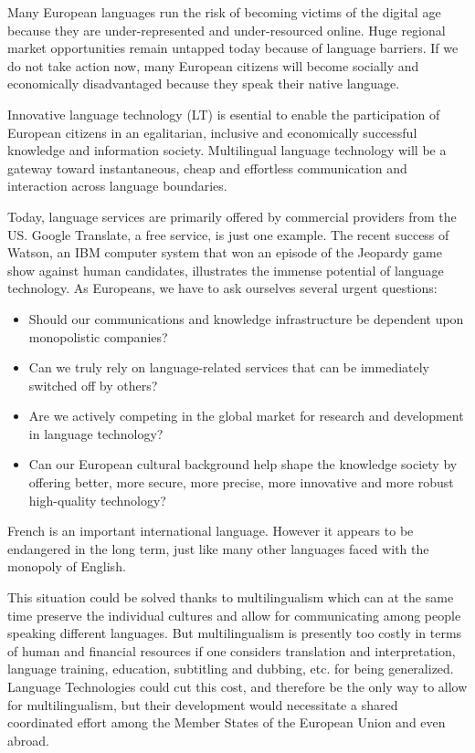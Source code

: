\setcounter{section}{0}
\setcounter{figure}{0}

\cleardoublepage



\begin{multicols}{2}
Many European languages run the risk of becoming victims of the
digital age because they are under-represented and under-resourced
online. Huge regional market opportunities remain untapped today
because of language barriers. If we do not take action now, many
European citizens will become socially and economically disadvantaged
because they speak their native language.

Innovative language technology (LT) is esential to enable the
participation of European citizens in an egalitarian, inclusive and
economically successful knowledge and information
society. Multilingual language technology will be a gateway toward
instantaneous, cheap and effortless communication and interaction
across language boundaries.

Today, language services are primarily offered by commercial providers
from the US. Google Translate, a free service, is just one
example. The recent success of Watson, an IBM computer system that won
an episode of the Jeopardy game show against human candidates,
illustrates the immense potential of language technology. As
Europeans, we have to ask ourselves several urgent questions:
\begin{itemize}
\item Should our communications and knowledge infrastructure be
  dependent upon monopolistic companies?
\item Can we truly rely on language-related services that can be
  immediately switched off by others?
\item Are we actively competing in the global market for research and
  development in language technology?
\item Can our European cultural background help shape the knowledge
  society by offering better, more secure, more precise, more
  innovative and more robust high-quality technology?
\end{itemize}

French is an important international language. However it appears to
be endangered in the long term, just like many other languages faced
with the monopoly of English.

This situation could be solved thanks to multilingualism which can at
the same time preserve the individual cultures and allow for
communicating among people speaking different languages. But
multilingualism is presently too costly in terms of human and
financial resources if one considers translation and interpretation,
language training, education, subtitling and dubbing, etc. for being
generalized. Language Technologies could cut this cost, and therefore
be the only way to allow for multilingualism, but their development
would necessitate a shared coordinated effort among the Member States
of the European Union and even abroad.


\end{multicols}
